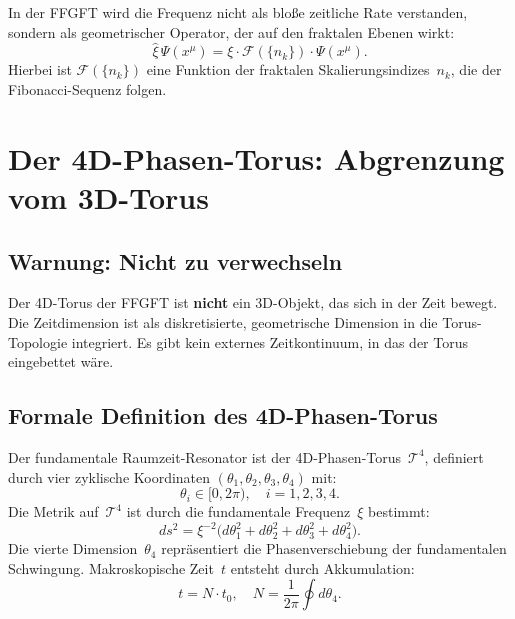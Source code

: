 In der FFGFT wird die Frequenz nicht als bloße zeitliche Rate verstanden,
sondern als geometrischer Operator, der auf den fraktalen Ebenen wirkt:
\begin{equation}
  \hat{\xi}\,\Psi(x^\mu) = \xi \cdot \mathcal{F}(\{n_k\}) \cdot \Psi(x^\mu).
\end{equation}
Hierbei ist $\mathcal{F}(\{n_k\})$ eine Funktion der fraktalen
Skalierungsindizes~$n_k$, die der Fibonacci-Sequenz folgen.

\section{Der 4D-Phasen-Torus: Abgrenzung vom 3D-Torus}

\subsection{Warnung: Nicht zu verwechseln}

\begin{warnbox}
Der 4D-Torus der FFGFT ist \textbf{nicht} ein 3D-Objekt, das sich in der
Zeit bewegt. Die Zeitdimension ist als diskretisierte, geometrische Dimension
in die Torus-Topologie integriert. Es gibt kein externes Zeitkontinuum, in das
der Torus eingebettet wäre.
\end{warnbox}

\subsection{Formale Definition des 4D-Phasen-Torus}

Der fundamentale Raumzeit-Resonator ist der 4D-Phasen-Torus~$\mathcal{T}^4$,
definiert durch vier zyklische Koordinaten $(\theta_1, \theta_2, \theta_3,
\theta_4)$ mit:
\begin{equation}
  \theta_i \in [0, 2\pi),\quad i = 1,2,3,4.
\end{equation}
Die Metrik auf~$\mathcal{T}^4$ ist durch die fundamentale Frequenz~$\xi$
bestimmt:
\begin{equation}
  ds^2 = \xi^{-2}
         \bigl(d\theta_1^2 + d\theta_2^2 + d\theta_3^2 + d\theta_4^2\bigr).
  \label{eq:metric}
\end{equation}
Die vierte Dimension~$\theta_4$ repräsentiert die Phasenverschiebung der
fundamentalen Schwingung. Makroskopische Zeit~$t$ entsteht durch Akkumulation:
\begin{equation}
  t = N \cdot t_0, \quad N = \frac{1}{2\pi}\oint d\theta_4.
\end{equation}

